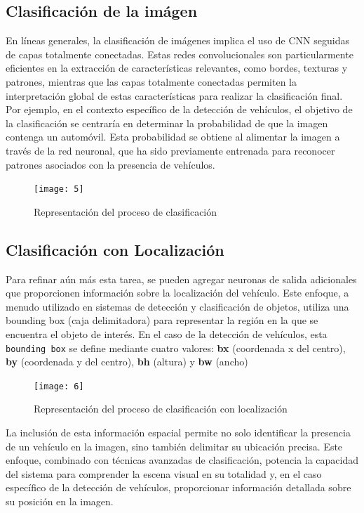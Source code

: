 	\subsection{Clasificación de la imágen}
	En líneas generales, la clasificación de imágenes implica el uso de CNN seguidas de capas totalmente conectadas. Estas redes convolucionales son particularmente eficientes en la extracción de características relevantes, como bordes, texturas y patrones, mientras que las capas totalmente conectadas permiten la interpretación global de estas características para realizar la clasificación final.
Por ejemplo, en el contexto específico de la detección de vehículos, el objetivo de la clasificación se centraría en determinar la probabilidad de que la imagen contenga un automóvil. Esta probabilidad se obtiene al alimentar la imagen a través de la red neuronal, que ha sido previamente entrenada para reconocer patrones asociados con la presencia de vehículos.
	\begin{figure}[ht]
	    \centering
		\texttt{[image: 5]}
		\caption{Representación del proceso de clasificación}
	\end{figure}

	\subsection{Clasificación con Localización}
	Para refinar aún más esta tarea, se pueden agregar neuronas de salida adicionales que proporcionen información sobre la localización del vehículo. Este enfoque, a menudo utilizado en sistemas de detección y clasificación de objetos, utiliza una bounding box (caja delimitadora) para representar la región en la que se encuentra el objeto de interés. En el caso de la detección de vehículos, esta \texttt{bounding box} se define mediante cuatro valores: \textbf{bx} (coordenada x del centro), \textbf{by} (coordenada y del centro), \textbf{bh} (altura) y \textbf{bw} (ancho)
	
	\begin{figure}[ht]
	    \centering
		\texttt{[image: 6]}
		\caption{Representación del proceso de clasificación con localización}
	\end{figure}
	
	La inclusión de esta información espacial permite no solo identificar la presencia de un vehículo en la imagen, sino también delimitar su ubicación precisa. Este enfoque, combinado con técnicas avanzadas de clasificación, potencia la capacidad del sistema para comprender la escena visual en su totalidad y, en el caso específico de la detección de vehículos, proporcionar información detallada sobre su posición en la imagen.
	
